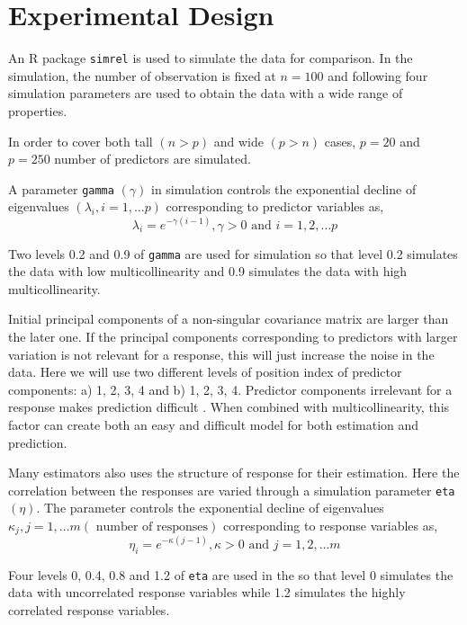 \documentclass[12pt,3p,authoryear]{elsarticle}
\providecommand{\tightlist}{%
  \setlength{\itemsep}{0pt}\setlength{\parskip}{0pt}}
\begin{document}
\hypertarget{experimental-design}{%
\section{Experimental Design}\label{experimental-design}}

An R \citep{coreR2018} package \texttt{simrel} \citep{Rimal2018, saebo2015simrel} is used to simulate the data for comparison. In the simulation, the number of observation is fixed at \(n = 100\) and following four simulation parameters are used to obtain the data with a wide range of properties.

\begin{description}
\tightlist
\item[\textbf{Number of predictors:}]
In order to cover both tall \((n>p)\) and wide \((p>n)\) cases, \(p= 20\) and \(p= 250\) number of predictors are simulated.
\item[\textbf{Multicollinearity in predictor variables:}]
A parameter \texttt{gamma} \((\gamma)\) in simulation controls the exponential decline of eigenvalues \((\lambda_i, i = 1, \ldots p)\) corresponding to predictor variables as,
\begin{equation}
  \lambda_i = e^{-\gamma(i-1)}, \gamma > 0 \text{ and } i = 1, 2, \ldots p
  \label{eq:gamma}
  \end{equation}

Two levels 0.2 and 0.9 of \texttt{gamma} are used for simulation so that level 0.2 simulates the data with low multicollinearity and 0.9 simulates the data with high multicollinearity.
\item[\textbf{Position of relevant components:}]
Initial principal components of a non-singular covariance matrix are larger than the later one. If the principal components corresponding to predictors with larger variation is not relevant for a response, this will just increase the noise in the data. Here we will use two different levels of position index of predictor components: a) 1, 2, 3, 4 and b) 1, 2, 3, 4. Predictor components irrelevant for a response makes prediction difficult \citep{Helland1994b}. When combined with multicollinearity, this factor can create both an easy and difficult model for both estimation and prediction.
\item[\textbf{Correlation in response variables:}]
Many estimators also uses the structure of response for their estimation. Here the correlation between the responses are varied through a simulation parameter \texttt{eta} \((\eta)\). The parameter controls the exponential decline of eigenvalues \(\kappa_j, j = 1, \ldots m (\text{ number of responses})\) corresponding to response variables as,
\begin{equation}
\eta_i = e^{-\kappa(j-1)}, \kappa > 0 \text{ and } j = 1, 2, \ldots m
\label{eq:eta}
\end{equation}

Four levels 0, 0.4, 0.8 and 1.2 of \texttt{eta} are used in the so that level 0 simulates the data with uncorrelated response variables while 1.2 simulates the highly correlated response variables.
\end{description}
\end{document}
